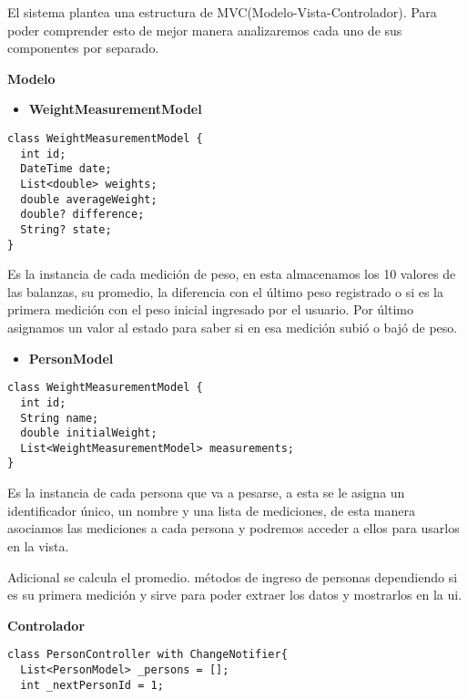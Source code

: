 
El sistema plantea una estructura de MVC(Modelo-Vista-Controlador). Para poder comprender esto de mejor manera analizaremos cada uno de sus componentes por separado.

\textbf{Modelo}

\begin{itemize}
    \item \textbf{WeightMeasurementModel}
\end{itemize}

\begin{center}
\begin{lstlisting}
class WeightMeasurementModel {
  int id;
  DateTime date;
  List<double> weights;
  double averageWeight;
  double? difference;
  String? state;
}
\end{lstlisting}
\end{center}

Es la instancia de cada medición de peso, en esta almacenamos los 10 valores de las balanzas, su promedio, la diferencia con el último peso registrado o si es la primera medición con el peso inicial ingresado por el usuario. Por último asignamos un valor al estado para saber si en esa medición subió o bajó de peso.

\begin{itemize}
    \item \textbf{PersonModel}
\end{itemize}

\begin{center}
\begin{lstlisting}
class WeightMeasurementModel {
  int id;
  String name;
  double initialWeight;
  List<WeightMeasurementModel> measurements;
}
\end{lstlisting}
\end{center}

Es la instancia de cada persona que va a pesarse, a esta se le asigna un identificador único, un nombre y una lista de mediciones, de esta manera asociamos las mediciones a cada persona y podremos acceder a ellos para usarlos en la vista.

Adicional se calcula el promedio. métodos de ingreso de personas dependiendo si es su primera medición y sirve para poder extraer los datos y mostrarlos en la ui.

\textbf{Controlador}

\begin{center}
\begin{lstlisting}
class PersonController with ChangeNotifier{
  List<PersonModel> _persons = [];
  int _nextPersonId = 1;
\end{lstlisting}
\end{center}

